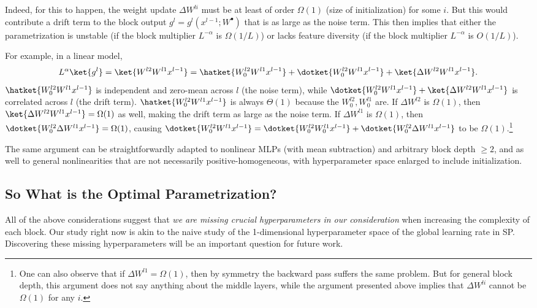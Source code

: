 Indeed, for this to happen, the weight update $\Delta W^{li}$ must be at least of order $\Omega(1)$ (size of initialization) for some $i$.  But this would contribute a drift term to the block output $g^l = g^l(x^{l-1}; W^{\bullet})$ that is as large as the noise term.
This then implies that either the parametrization is unstable (if the block multiplier $L^{-\alpha}$ is  $\Omega(1/{L})$) or lacks feature diversity (if the block multiplier $L^{-\alpha}$ is $O(1/L)$).

For example, in a linear model, $$L^{\alpha}\ket{g^l} = \ket{W^{l2} W^{l1} x^{l-1}} = \hatket{W_0^{l2} W^{l1} x^{l-1}} + \dotket{W_0^{l2} W^{l1} x^{l-1}} + \ket{\Delta W^{l2} W^{l1} x^{l-1}}.$$ 
$\hatket{W_0^{l2} W^{l1} x^{l-1}}$ is independent and zero-mean across $l$ (the noise term), while $\dotket{W_0^{l2} W^{l1} x^{l-1}} + \ket{\Delta W^{l2} W^{l1} x^{l-1}}$ is correlated across $l$ (the drift term).
$\hatket{W_0^{l2} W^{l1} x^{l-1}}$ is always $\Theta(1)$ because the $W^{l2}_0, W^{l1}_0$ are.
If $\Delta W^{l2}$ is $\Omega(1)$, then $\ket{\Delta W^{l2} W^{l1} x^{l-1}} = \Omega(1)$ as well, making the drift term as large as the noise term.
If $\Delta W^{l1}$ is $\Omega(1)$, then $\dotket{W_0^{l2} \Delta W^{l1} x^{l-1}} = \Omega(1)$, causing $\dotket{W_0^{l2} W^{l1} x^{l-1}} = \dotket{W_0^{l2} W_0^{l1} x^{l-1}} + \dotket{W_0^{l2} \Delta W^{l1} x^{l-1}}$ to be $\Omega(1)$.\footnote{One can also observe that if $\Delta W^{l1} = \Omega(1)$, then by symmetry the backward pass suffers the same problem. But for general block depth, this argument does not say anything about the middle layers, while the argument presented above implies that $\Delta W^{li}$ cannot be $\Omega(1)$ for any $i$.}

The same argument can be straightforwardly adapted to nonlinear MLPs (with mean subtraction) and arbitrary block depth $\ge 2$, and as well to general nonlinearities that are not necessarily positive-homogeneous, with hyperparameter space enlarged to include initialization.

\subsection{So What is the Optimal Parametrization?}

All of the above considerations suggest that \emph{we are missing crucial hyperparameters in our consideration} when increasing the complexity of each block.
Our study right now is akin to the naive study of the 1-dimensional hyperparameter space of the global learning rate in SP.
Discovering these missing hyperparameters will be an important question for future work.
